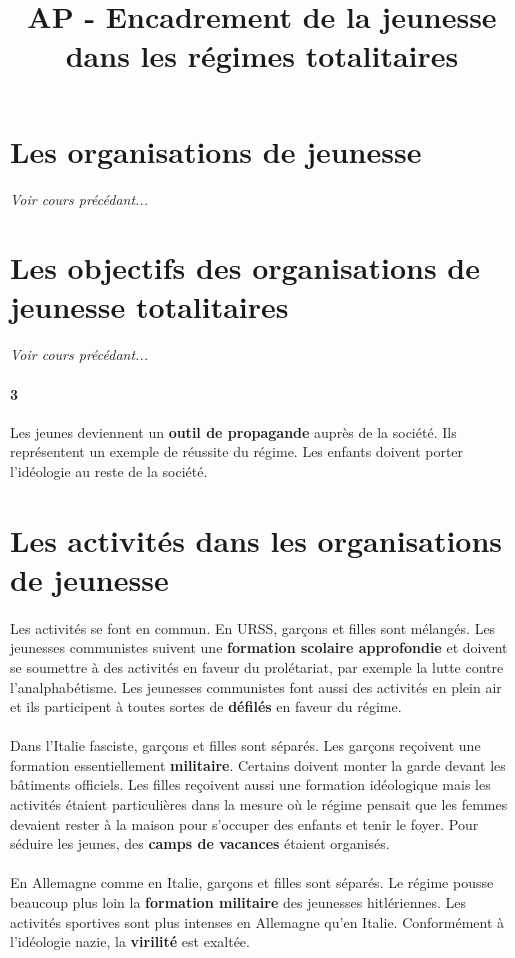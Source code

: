 \documentclass[12pt]{article}
\title{\textbf{AP - Encadrement de la jeunesse dans les régimes totalitaires}}
\date{}
\renewcommand{\emph}{\textbf}
\begin{document}
\maketitle

\section{Les organisations de jeunesse}

\textit{Voir cours précédant...}

\section{Les objectifs des organisations de jeunesse totalitaires}

\textit{Voir cours précédant...}

\paragraph{3}
Les jeunes deviennent un \emph{outil de propagande} auprès de la société. Ils représentent un exemple de réussite du régime. Les enfants doivent porter l'idéologie au reste de la société.

\section{Les activités dans les organisations de jeunesse}

\paragraph{}
Les activités se font en commun. En URSS, garçons et filles sont mélangés. Les jeunesses communistes suivent une \emph{formation scolaire approfondie} et doivent se soumettre à des activités en faveur du prolétariat, par exemple la lutte contre l'analphabétisme. Les jeunesses communistes font aussi des activités en plein air et ils participent à toutes sortes de \emph{défilés} en faveur du régime.

\paragraph{}
Dans l'Italie fasciste, garçons et filles sont séparés. Les garçons reçoivent une formation essentiellement \emph{militaire}. Certains doivent monter la garde devant les bâtiments officiels. Les filles reçoivent aussi une formation idéologique mais les activités étaient particulières dans la mesure où le régime pensait que les femmes devaient rester à la maison pour s'occuper des enfants et tenir le foyer. Pour séduire les jeunes, des \emph{camps de vacances} étaient organisés.

\paragraph{}
En Allemagne comme en Italie, garçons et filles sont séparés. Le régime pousse beaucoup plus loin la \emph{formation militaire} des jeunesses hitlériennes. Les activités sportives sont plus intenses en Allemagne qu'en Italie. Conformément à l'idéologie nazie, la \emph{virilité} est exaltée.
\end{document}
